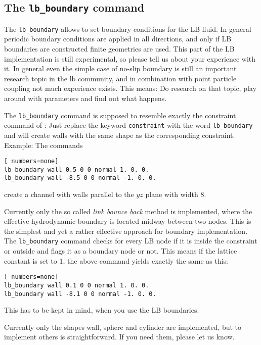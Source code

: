 \subsection*{The \lstinline|lb_boundary| command}
The \lstinline|lb_boundary| allows to set boundary conditions for the LB fluid. In general
periodic boundary conditions are applied in all directions, and only if LB boundaries
are constructed finite geometries are used. This part of the LB implementation is still experimental,
so please tell us about your experience with it. In general even the simple case of no-slip
boundary is still an important research topic in the lb community, and in combination with
point particle coupling not much experience exists. This means: Do research on that topic, play
around with parameters and find out what happens. 


The \lstinline|lb_boundary| command is supposed to resemble exactly the constraint command of 
\ES{}: Just replace the keyword \lstinline|constraint| with the word \lstinline|lb_boundary| 
and \ES{} will create walls with the same shape as the corresponding constraint. Example:
The commands
\begin{lstlisting}[ numbers=none]
lb_boundary wall 0.5 0 0 normal 1. 0. 0. 
lb_boundary wall -8.5 0 0 normal -1. 0. 0. 
\end{lstlisting}
create a channel with walls parallel to the $yz$ plane with width 8.

Currently only the so called \emph{link bounce back} method is implemented, where the effective
hydrodynamic boundary is located midway between two nodes. This is the simplest and yet a 
rather effective approach for boundary implementation. The \lstinline|lb_boundary| command
checks for every LB node if it is inside the constraint or outside and flags it as a boundary
node or not. This means if the lattice constant is set to 1, the above command yields exactly
the same as this:
\begin{lstlisting}[ numbers=none]
lb_boundary wall 0.1 0 0 normal 1. 0. 0. 
lb_boundary wall -8.1 0 0 normal -1. 0. 0. 
\end{lstlisting}
This has to be kept in mind, when you use the LB boundaries.

Currently only the shapes wall, sphere and cylinder are implemented, but to implement others 
is straightforward. If you need them, please let us know.
